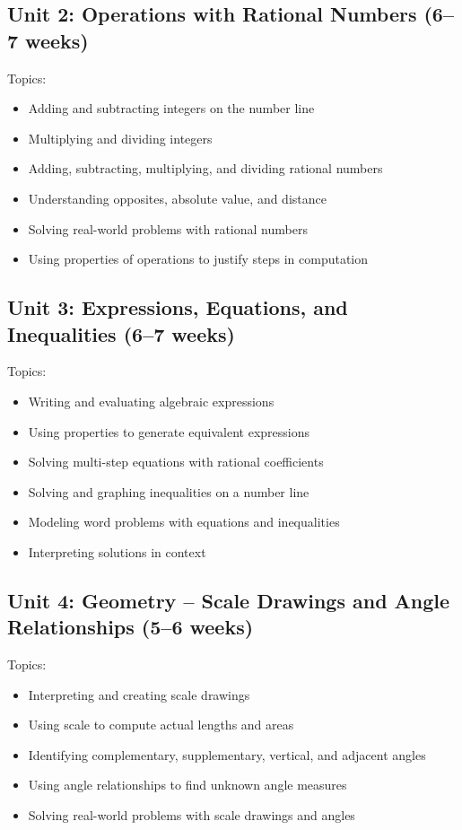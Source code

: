 \documentclass[11pt,letterpaper]{report}
\begin{document}
\subsection{Unit 2: Operations with Rational Numbers (6–7 weeks)}

Topics:
\begin{itemize}
\item Adding and subtracting integers on the number line
\item Multiplying and dividing integers
\item Adding, subtracting, multiplying, and dividing rational numbers
\item Understanding opposites, absolute value, and distance
\item Solving real-world problems with rational numbers
\item Using properties of operations to justify steps in computation
\end{itemize}

\subsection{Unit 3: Expressions, Equations, and Inequalities (6–7 weeks)}

Topics:
\begin{itemize}
\item Writing and evaluating algebraic expressions
\item Using properties to generate equivalent expressions
\item Solving multi-step equations with rational coefficients
\item Solving and graphing inequalities on a number line
\item Modeling word problems with equations and inequalities
\item Interpreting solutions in context
\end{itemize}

\subsection{Unit 4: Geometry – Scale Drawings and Angle Relationships (5–6 weeks)}

Topics:
\begin{itemize}
\item Interpreting and creating scale drawings
\item Using scale to compute actual lengths and areas
\item Identifying complementary, supplementary, vertical, and adjacent angles
\item Using angle relationships to find unknown angle measures
\item Solving real-world problems with scale drawings and angles
\end{itemize}
\end{document}
